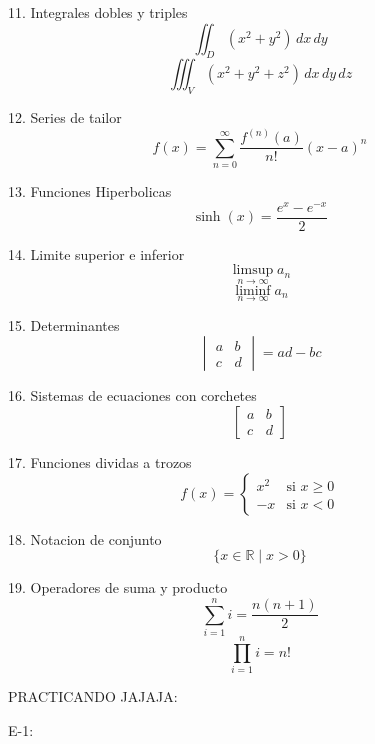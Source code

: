 \documentclass[12pt,Letterpaper]{article}
\begin{document}
11. Integrales dobles y triples \[\iint_{D} (x^2 + y^2) \, dx \, dy\]\[\iiint_{V} (x^2 + y^2 + z^2) \, dx \, dy \, dz\]

 
12. Series de tailor \[f(x) = \sum_{n=0}^{\infty} \frac{f^{(n)}(a)}{n!} (x - a)^n\]


13. Funciones Hiperbolicas \[\sinh(x) = \frac{e^x - e^{-x}}{2}\]


14. Limite superior e inferior \[\limsup_{n \to \infty} a_n\]\[\liminf_{n \to \infty} a_n\]


15. Determinantes \[\begin{vmatrix}a & b \\c & d\end{vmatrix} = ad - bc\]

 
16. Sistemas de ecuaciones con corchetes \[\begin{bmatrix}a & b \\c & d\end{bmatrix}\]


17. Funciones dividas a trozos \[f(x) = \begin{cases} x^2 & \text{si } x \geq 0 \\
-x & \text{si } x < 0 \end{cases}\]


18. Notacion de conjunto  \[\{ x \in \mathbb{R} \mid x > 0 \}\]


19. Operadores de suma y producto \[\sum_{i=1}^{n} i = \frac{n(n+1)}{2}\]\[\prod_{i=1}^{n} i = n!\]



PRACTICANDO JAJAJA:

E-1: 
\end{document}
